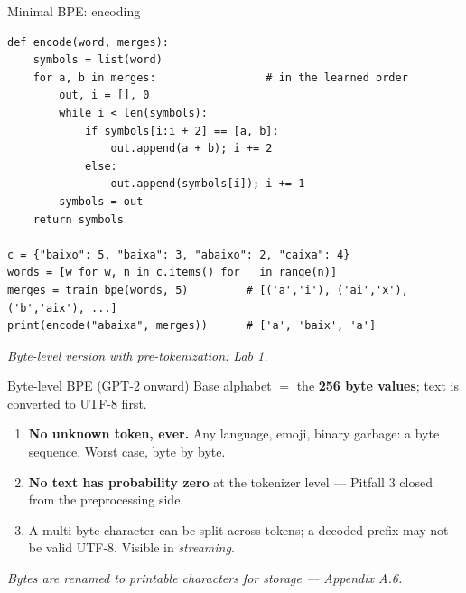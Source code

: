 \documentclass[11pt,aspectratio=169]{beamer}
\newcommand{\dest}[1]{\textcolor{structure}{\textbf{#1}}}
\newcommand{\hook}[1]{{\small\textcolor{gray!60!black}{\textit{#1}}}}
\begin{document}
\begin{frame}[fragile]{Minimal BPE: encoding}
\begin{lstlisting}[style=py]
def encode(word, merges):
    symbols = list(word)
    for a, b in merges:                 # in the learned order
        out, i = [], 0
        while i < len(symbols):
            if symbols[i:i + 2] == [a, b]:
                out.append(a + b); i += 2
            else:
                out.append(symbols[i]); i += 1
        symbols = out
    return symbols

c = {"baixo": 5, "baixa": 3, "abaixo": 2, "caixa": 4}
words = [w for w, n in c.items() for _ in range(n)]
merges = train_bpe(words, 5)         # [('a','i'), ('ai','x'), ('b','aix'), ...]
print(encode("abaixa", merges))      # ['a', 'baix', 'a']
\end{lstlisting}
\hook{Byte-level version with pre-tokenization: Lab 1.}
\end{frame}

\begin{frame}{Byte-level BPE (GPT-2 onward)}
  Base alphabet $=$ the \dest{256 byte values}; text is converted to UTF-8 first.

  \vspace{0.8em}
  \begin{enumerate}
    \item \dest{No unknown token, ever.} Any language, emoji, binary garbage: a byte
          sequence. Worst case, byte by byte.
    \item \dest{No text has probability zero} at the tokenizer level --- Pitfall 3 closed
          from the preprocessing side.
    \item A multi-byte character can be split across tokens; a decoded prefix may not be
          valid UTF-8. Visible in \emph{streaming}.
  \end{enumerate}

  \vspace{0.6em}
  \hook{Bytes are renamed to printable characters for storage --- Appendix A.6.}
\end{frame}
\end{document}
